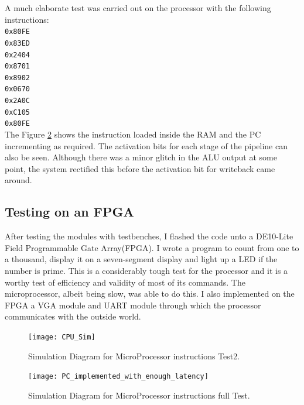 A much elaborate test was carried out on the processor with the following instructions:\\
\verb|0x80FE| \\
\verb|0x83ED|	\\
\verb|0x2404|	\\
\verb|0x8701| \\
\verb|0x8902|	\\
\verb|0x0670|	\\
\verb|0x2A0C|	\\
\verb|0xC105| \\
\verb|0x80FE|	\\



The Figure \ref{fig:sim_cpu_3} shows the instruction loaded inside the RAM and the PC incrementing as required. The activation bits for each stage of the pipeline can also be seen. Although there was a minor glitch in the ALU output at some point, the system rectified this before the activation bit for writeback came around. 

\subsection{Testing on an FPGA}
After testing the modules with testbenches, I flashed the code unto a DE10-Lite Field Programmable Gate Array(FPGA). I wrote a program to count from one to a  thousand, display it on a seven-segment display and light up a LED if the number is prime. This is a considerably tough test for the processor and it is a worthy test of efficiency and validity of most of its commands. The microprocessor, albeit being slow, was able to do this. I also implemented on the FPGA a VGA module and UART module through which the processor communicates with the outside world.

\begin{figure}
    \centering
    \texttt{[image: CPU\_Sim]}
	\caption{Simulation Diagram for MicroProcessor instructions Test2.}
    \label{fig:sim_cpu_2}
\end{figure}


\begin{figure}
    \centering
    \texttt{[image: PC\_implemented\_with\_enough\_latency]}
	\caption{Simulation Diagram for MicroProcessor instructions full Test.}
    \label{fig:sim_cpu_3}
\end{figure}

